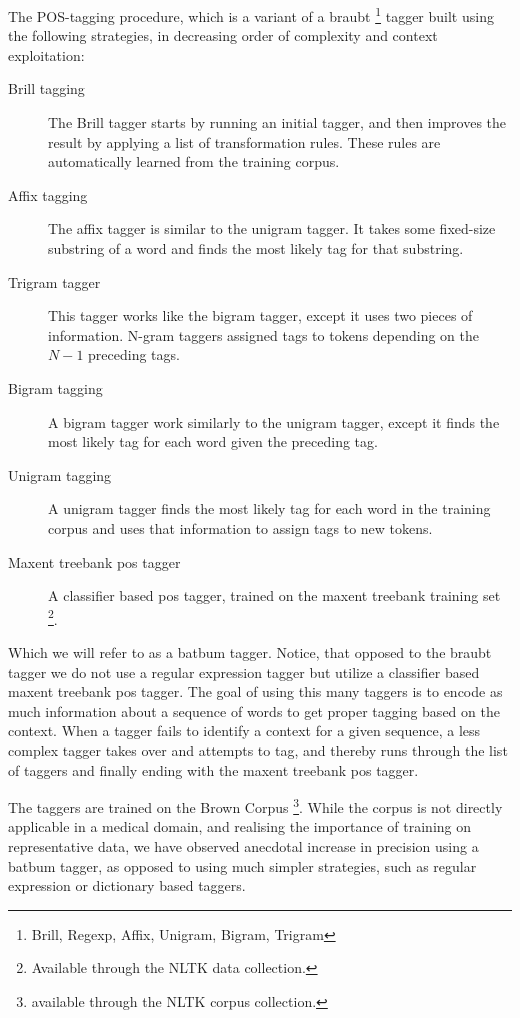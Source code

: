 \documentclass[10pt,letterpaper,final]{article}
\begin{document}
The POS-tagging procedure, which is a variant of a braubt
\footnote{Brill, Regexp, Affix, Unigram, Bigram, Trigram} tagger built
using the following strategies, in decreasing order of complexity and
context exploitation:
\begin{description}
\item[Brill tagging] The Brill\cite{Brill:1992:SRP:974499.974526} tagger
starts by running an initial tagger, and then improves the result by
applying a list of transformation rules. These rules are automatically
learned from the training corpus.
\item[Affix tagging] The affix tagger is similar to the unigram tagger.
It takes some fixed-size substring of a word and finds the most likely
tag for that substring.
\item[Trigram tagger] This tagger works like the bigram tagger, except it
uses two pieces of information. N-gram taggers assigned tags to tokens
depending on the $N - 1$ preceding tags.
\item[Bigram tagging] A bigram tagger work similarly to the unigram
tagger, except it finds the most likely tag for each word given the
preceding tag.
\item[Unigram tagging] A unigram tagger finds the most likely tag for each word
in the training corpus and uses that information to assign tags to new
tokens.
\item[Maxent treebank pos tagger] A classifier based pos tagger, trained
on the maxent treebank training set \footnote{Available through the NLTK
data collection.}.
\end{description}
Which we will refer to as a batbum tagger. Notice, that opposed to the
braubt tagger we do not use a regular expression tagger but utilize a
classifier based maxent treebank pos tagger. The goal of using this many
taggers is to encode as much information about a sequence of words to
get proper tagging based on the context. When a tagger fails to identify
a context for a given sequence, a less complex tagger takes over and
attempts to tag, and thereby runs through the list of taggers and
finally ending with the maxent treebank pos tagger.

The taggers are trained on the Brown Corpus \footnote{available through
the NLTK corpus collection.}. While the corpus is not directly
applicable in a medical domain, and realising the importance of training
on representative data, we have observed anecdotal increase in precision
using a batbum tagger, as opposed to using much simpler strategies, such
as regular expression or dictionary based taggers.
\end{document}
